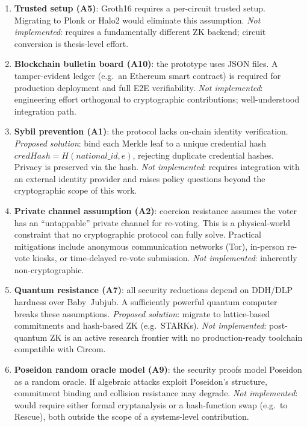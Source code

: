 \documentclass[conference]{IEEEtran}
\begin{document}
\begin{enumerate}
  \item \textbf{Trusted setup (A5)}: Groth16 requires a per-circuit trusted setup.
    Migrating to Plonk or Halo2 would eliminate this assumption.
    \emph{Not implemented}: requires a fundamentally different ZK backend;
    circuit conversion is thesis-level effort.

  \item \textbf{Blockchain bulletin board (A10)}: the prototype uses JSON files.
    A tamper-evident ledger (e.g.\ an Ethereum smart contract) is required
    for production deployment and full E2E verifiability.
    \emph{Not implemented}: engineering effort orthogonal to cryptographic
    contributions; well-understood integration path.

  \item \textbf{Sybil prevention (A1)}: the protocol lacks on-chain identity
    verification.  \emph{Proposed solution}: bind each Merkle leaf to a
    unique credential hash $\mathit{credHash} = H(\mathit{national\_id},
    e)$, rejecting duplicate credential hashes.  Privacy is preserved via
    the hash.  \emph{Not implemented}: requires integration with an external
    identity provider and raises policy questions beyond the cryptographic
    scope of this work.

  \item \textbf{Private channel assumption (A2)}: coercion resistance
    assumes the voter has an ``untappable'' private channel for re-voting.
    This is a physical-world constraint that no cryptographic protocol can
    fully solve.  Practical mitigations include anonymous communication
    networks (Tor), in-person re-vote kiosks, or time-delayed re-vote
    submission.  \emph{Not implemented}: inherently non-cryptographic.

  \item \textbf{Quantum resistance (A7)}: all security reductions depend on
    DDH/DLP hardness over Baby~Jubjub.  A sufficiently powerful quantum
    computer breaks these assumptions.  \emph{Proposed solution}: migrate
    to lattice-based commitments and hash-based ZK (e.g.\ STARKs).
    \emph{Not implemented}: post-quantum ZK is an active research frontier
    with no production-ready toolchain compatible with Circom.

  \item \textbf{Poseidon random oracle model (A9)}: the security proofs
    model Poseidon as a random oracle.  If algebraic attacks exploit
    Poseidon's structure, commitment binding and collision resistance
    may degrade.  \emph{Not implemented}: would require either formal
    cryptanalysis or a hash-function swap (e.g.\ to Rescue), both outside
    the scope of a systems-level contribution.


\end{enumerate}
\end{document}
